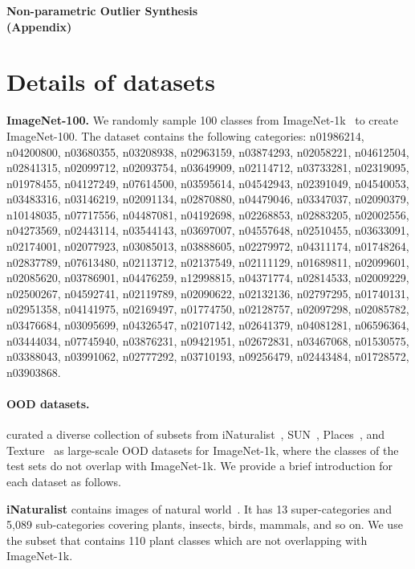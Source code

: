\clearpage
\begin{center}
    \Large{\textbf{Non-parametric Outlier Synthesis\\(Appendix)}}
\end{center}

\section{Details of datasets}
\label{sec:app_dataset}
\textbf{ImageNet-100.} We randomly sample 100 classes from ImageNet-1k~\citep{deng2009imagenet} to create ImageNet-100. The dataset contains the following categories: {\scriptsize n01986214, n04200800, n03680355, n03208938, n02963159, n03874293, n02058221, n04612504, n02841315, n02099712, n02093754, n03649909, n02114712, n03733281, n02319095, n01978455, n04127249, n07614500, n03595614, n04542943, n02391049, n04540053, n03483316, n03146219, n02091134, n02870880, n04479046, n03347037, n02090379, n10148035, n07717556, n04487081, n04192698, n02268853, n02883205, n02002556, n04273569, n02443114, n03544143, n03697007, n04557648, n02510455, n03633091, n02174001, n02077923, n03085013, n03888605, n02279972, n04311174, n01748264, n02837789, n07613480, n02113712, n02137549, n02111129, n01689811, n02099601, n02085620, n03786901, n04476259, n12998815, n04371774, n02814533, n02009229, n02500267, n04592741, n02119789, n02090622, n02132136, n02797295, n01740131, n02951358, n04141975, n02169497, n01774750, n02128757, n02097298, n02085782, n03476684, n03095699, n04326547, n02107142, n02641379, n04081281, n06596364, n03444034, n07745940, n03876231, n09421951, n02672831, n03467068, n01530575, n03388043, n03991062, n02777292, n03710193, n09256479, n02443484, n01728572, n03903868}.

\vspace{-0.2cm}

\paragraph{OOD datasets.} \citeauthor{huang2021mos} curated a diverse collection of subsets from iNaturalist~\citep{van2018inaturalist}, SUN~\citep{xiao2010sun}, Places~\citep{zhou2017places}, and Texture~\citep{cimpoi2014describing} as large-scale OOD datasets for ImageNet-1k, where the classes of the test sets do not overlap with ImageNet-1k. We provide a brief introduction for each dataset as follows.
 
\textbf{iNaturalist} contains images of natural world~\citep{van2018inaturalist}. It has 13 super-categories and 5,089 sub-categories covering plants, insects, birds, mammals, and so on. We use the subset that contains 110 plant classes which are not overlapping with ImageNet-1k.

